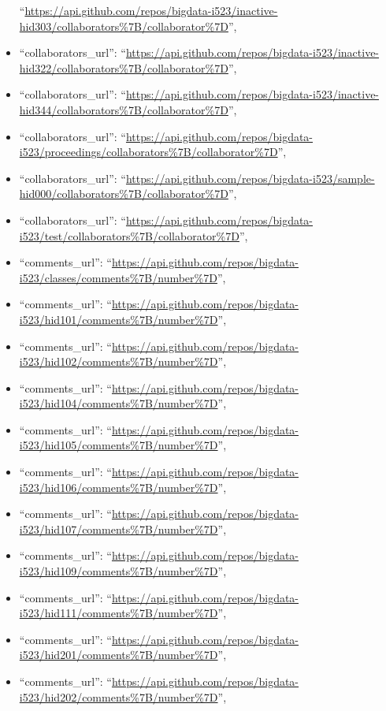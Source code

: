 \begin{itemize}
  ``\url{https://api.github.com/repos/bigdata-i523/inactive-hid303/collaborators\%7B/collaborator\%7D}'',
\item
  ``collaborators\_url'':
  ``\url{https://api.github.com/repos/bigdata-i523/inactive-hid322/collaborators\%7B/collaborator\%7D}'',
\item
  ``collaborators\_url'':
  ``\url{https://api.github.com/repos/bigdata-i523/inactive-hid344/collaborators\%7B/collaborator\%7D}'',
\item
  ``collaborators\_url'':
  ``\url{https://api.github.com/repos/bigdata-i523/proceedings/collaborators\%7B/collaborator\%7D}'',
\item
  ``collaborators\_url'':
  ``\url{https://api.github.com/repos/bigdata-i523/sample-hid000/collaborators\%7B/collaborator\%7D}'',
\item
  ``collaborators\_url'':
  ``\url{https://api.github.com/repos/bigdata-i523/test/collaborators\%7B/collaborator\%7D}'',
\item
  ``comments\_url'':
  ``\url{https://api.github.com/repos/bigdata-i523/classes/comments\%7B/number\%7D}'',
\item
  ``comments\_url'':
  ``\url{https://api.github.com/repos/bigdata-i523/hid101/comments\%7B/number\%7D}'',
\item
  ``comments\_url'':
  ``\url{https://api.github.com/repos/bigdata-i523/hid102/comments\%7B/number\%7D}'',
\item
  ``comments\_url'':
  ``\url{https://api.github.com/repos/bigdata-i523/hid104/comments\%7B/number\%7D}'',
\item
  ``comments\_url'':
  ``\url{https://api.github.com/repos/bigdata-i523/hid105/comments\%7B/number\%7D}'',
\item
  ``comments\_url'':
  ``\url{https://api.github.com/repos/bigdata-i523/hid106/comments\%7B/number\%7D}'',
\item
  ``comments\_url'':
  ``\url{https://api.github.com/repos/bigdata-i523/hid107/comments\%7B/number\%7D}'',
\item
  ``comments\_url'':
  ``\url{https://api.github.com/repos/bigdata-i523/hid109/comments\%7B/number\%7D}'',
\item
  ``comments\_url'':
  ``\url{https://api.github.com/repos/bigdata-i523/hid111/comments\%7B/number\%7D}'',
\item
  ``comments\_url'':
  ``\url{https://api.github.com/repos/bigdata-i523/hid201/comments\%7B/number\%7D}'',
\item
  ``comments\_url'':
  ``\url{https://api.github.com/repos/bigdata-i523/hid202/comments\%7B/number\%7D}'',

\end{itemize}
